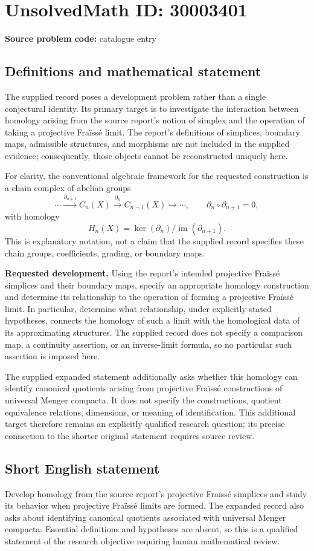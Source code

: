 \documentclass[11pt]{article}
\begin{document}
\section*{UnsolvedMath ID: 30003401}
\textbf{Source problem code:} catalogue entry
\subsection{Definitions and mathematical statement}
The supplied record poses a development problem rather than a single conjectural identity. Its primary target is to investigate the interaction between homology arising from the source report's notion of simplex and the operation of taking a projective Fra\"iss\'e limit. The report's definitions of simplices, boundary maps, admissible structures, and morphisms are not included in the supplied evidence; consequently, those objects cannot be reconstructed uniquely here.

For clarity, the conventional algebraic framework for the requested construction is a chain complex of abelian groups
\[
\cdots \xrightarrow{\partial_{n+1}} C_n(X)
\xrightarrow{\partial_n} C_{n-1}(X)\xrightarrow{}\cdots,
\qquad \partial_n\circ\partial_{n+1}=0,
\]
with homology
\[
H_n(X)=\ker(\partial_n)/\operatorname{im}(\partial_{n+1}).
\]
This is explanatory notation, not a claim that the supplied record specifies these chain groups, coefficients, grading, or boundary maps.

\textbf{Requested development.} Using the report's intended projective Fra\"iss\'e simplices and their boundary maps, specify an appropriate homology construction and determine its relationship to the operation of forming a projective Fra\"iss\'e limit. In particular, determine what relationship, under explicitly stated hypotheses, connects the homology of such a limit with the homological data of its approximating structures. The supplied record does not specify a comparison map, a continuity assertion, or an inverse-limit formula, so no particular such assertion is imposed here.

The supplied expanded statement additionally asks whether this homology can identify canonical quotients arising from projective Fra\"iss\'e constructions of universal Menger compacta. It does not specify the constructions, quotient equivalence relations, dimensions, or meaning of identification. This additional target therefore remains an explicitly qualified research question; its precise connection to the shorter original statement requires source review.
\subsection{Short English statement}
Develop homology from the source report's projective Fra\"iss\'e simplices and study its behavior when projective Fra\"iss\'e limits are formed. The expanded record also asks about identifying canonical quotients associated with universal Menger compacta. Essential definitions and hypotheses are absent, so this is a qualified statement of the research objective requiring human mathematical review.
\end{document}
